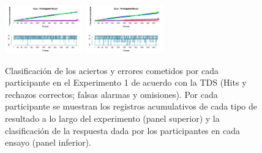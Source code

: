\documentclass[a4paper ]{article}
\begin{document}
\begin{figure}[th]
\includegraphics[width=0.3\textwidth]{Figures/Outcome_Exp1_P19} \includegraphics[width=0.3\textwidth]{Figures/Outcome_Exp1_P20} 
\caption[Resultados obtenidos por ensayo; Experimento 1]{Clasificación de los aciertos y errores cometidos por cada participante en el Experimento 1 de acuerdo con la TDS (Hits y rechazos correctos; falsas alarmas y omisiones). Por cada participante se muestran los registros acumulativos de cada tipo de resultado a lo largo del experimento (panel superior) y la clasificación de la respuesta dada por los participantes en cada ensayo (panel inferior).}
\label{fig:Outcome_E1}
\end{figure}
\end{document}
